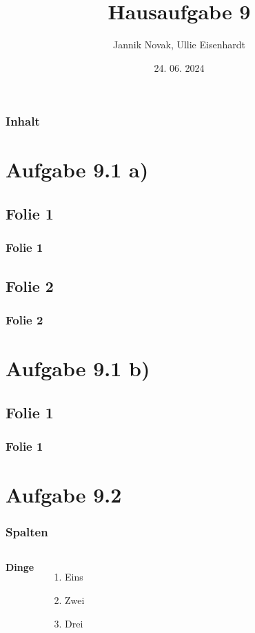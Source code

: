 \documentclass{beamer}
\title{Hausaufgabe 9}
\author{Jannik Novak, Ullie Eisenhardt}
\date{24. 06. 2024}
\begin{document}
\begin{frame}
\maketitle
\end{frame}

\begin{frame}
\frametitle{Inhalt}
\tableofcontents
\end{frame}

\section{Aufgabe 9.1 a)}
\subsection{Folie 1}
\begin{frame}
\frametitle{Folie 1}
\blindtext
\end{frame}

\subsection{Folie 2}
\begin{frame}
\frametitle{Folie 2}
\blindtext
\end{frame}

\section{Aufgabe 9.1 b)}
\subsection{Folie 1}
\begin{frame}
\frametitle{Folie 1}
\blindtext
\end{frame}

\section{Aufgabe 9.2}
\begin{frame}
\frametitle{Spalten}
\begin{columns}[c]
\textbf{Dinge}
\begin{enumerate}
    \item Eins
    \item Zwei
    \item Drei
\end{enumerate}
\end{columns}    
\end{frame}
\end{document}
